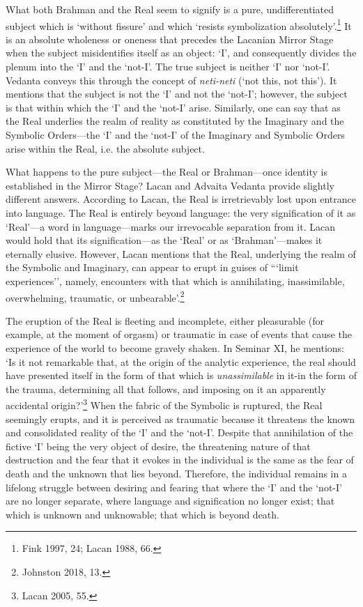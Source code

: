 What both Brahman and the Real seem to signify is a pure,
undifferentiated subject which is `without fissure' and which `resists
symbolization absolutely'.\footnote{Fink 1997, 24; Lacan 1988, 66.} It is an
absolute wholeness or oneness that precedes the Lacanian Mirror Stage
when the subject misidentifies itself as an object: `I', and
consequently divides the plenum into the `I' and the `not-I'. The true
subject is neither `I' nor `not-I'. Vedanta conveys this through the
concept of \emph{neti-neti} (`not this, not this'). It mentions that the
subject is not the `I' and not the `not-I'; however, the subject is that
within which the `I' and the `not-I' arise. Similarly, one can say that
as the Real underlies the realm of reality as constituted by the
Imaginary and the Symbolic Orders---the `I' and the `not-I' of the
Imaginary and Symbolic Orders arise within the Real, i.e. the absolute
subject.

What happens to the pure subject---the Real or Brahman---once identity
is established in the Mirror Stage? Lacan and Advaita Vedanta provide
slightly different answers. According to Lacan, the Real is
irretrievably lost upon entrance into language. The Real is entirely
beyond language: the very signification of it as `Real'---a word in
language---marks our irrevocable separation from it. Lacan would hold
that its signification---as the `Real' or as `Brahman'---makes it
eternally elusive. However, Lacan mentions that the Real, underlying the
realm of the Symbolic and Imaginary, can appear to erupt in guises of
```limit experiences'', namely, encounters with that which is
annihilating, inassimilable, overwhelming, traumatic, or unbearable'.\footnote{Johnston 2018, 13.}

The eruption of the Real is fleeting and incomplete, either pleasurable
(for example, at the moment of orgasm) or traumatic in case of events
that cause the experience of the world to become gravely shaken. In
Seminar XI, he mentions: `Is it not remarkable that, at the origin of
the analytic experience, the real should have presented itself in the
form of that which is \emph{unassimilable} in it-in the form of the
trauma, determining all that follows, and imposing on it an apparently
accidental origin?'\footnote{Lacan 2005, 55.} When the fabric of the Symbolic is
ruptured, the Real seemingly erupts, and it is perceived as traumatic
because it threatens the known and consolidated reality of the `I' and
the `not-I'. Despite that annihilation of the fictive `I' being the very
object of desire, the threatening nature of that destruction and the
fear that it evokes in the individual is the same as the fear of death
and the unknown that lies beyond. Therefore, the individual remains in a
lifelong struggle between desiring and fearing that where the `I' and
the `not-I' are no longer separate, where language and signification no
longer exist; that which is unknown and unknowable; that which is beyond
death.

